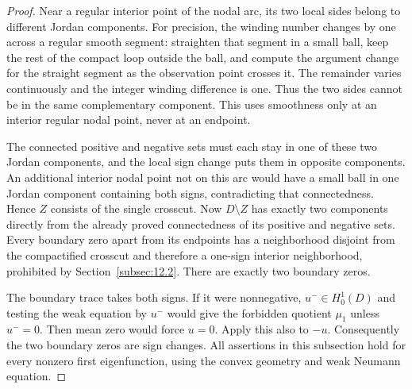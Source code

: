 \documentclass[11pt]{article}
\theoremstyle{definition}
\theoremstyle{remark}
\numberwithin{equation}{section}
\begin{document}
\begin{proof}
Near a regular interior point of the nodal arc, its two local sides belong to different Jordan components. For precision, the winding number changes by one across a regular smooth segment: straighten that segment in a small ball, keep the rest of the compact loop outside the ball, and compute the argument change for the straight segment as the observation point crosses it. The remainder varies continuously and the integer winding difference is one. Thus the two sides cannot be in the same complementary component. This uses smoothness only at an interior regular nodal point, never at an endpoint.

The connected positive and negative sets must each stay in one of these two Jordan components, and the local sign change puts them in opposite components. An additional interior nodal point not on this arc would have a small ball in one Jordan component containing both signs, contradicting that connectedness. Hence $Z$ consists of the single crosscut. Now $D\setminus Z$ has exactly two components directly from the already proved connectedness of its positive and negative sets. Every boundary zero apart from its endpoints has a neighborhood disjoint from the compactified crosscut and therefore a one-sign interior neighborhood, prohibited by Section~\ref{subsec:12.2}. There are exactly two boundary zeros.

The boundary trace takes both signs. If it were nonnegative, $u^-\in H^1_0(D)$ and testing the weak equation by $u^-$ would give the forbidden quotient $\mu_1$ unless $u^-=0$. Then mean zero would force $u=0$. Apply this also to $-u$. Consequently the two boundary zeros are sign changes. All assertions in this subsection hold for every nonzero first eigenfunction, using the convex geometry and weak Neumann equation.

\end{proof}
\end{document}
